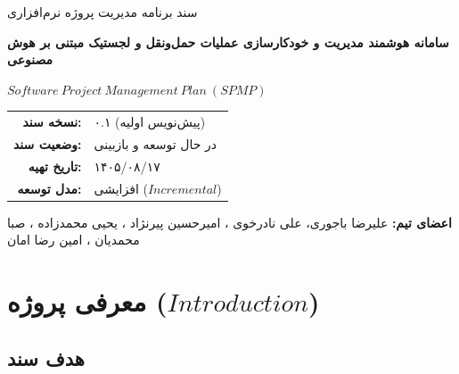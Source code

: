 \documentclass[12pt,a4paper]{article}
\begin{document}
	
	
	\begin{titlepage}
		\centering
		
		\vspace*{2cm}
		
		{\Large سند برنامه مدیریت پروژه نرم‌افزاری}
		
		\vspace{1cm}
		
		{\huge\bfseries
			سامانه هوشمند مدیریت و خودکارسازی
			عملیات حمل‌ونقل و لجستیک
			مبتنی بر هوش مصنوعی
		}
		
		\vspace{1.5cm}
		
		{\Large $Software\ Project\ Management\ Plan\ (SPMP)$}
		
		\vspace{2cm}
		
		\begin{tabular}{rl}
			\textbf{نسخه سند:} & ۰.۱ (پیش‌نویس اولیه) \\
			\textbf{وضعیت سند:} & در حال توسعه و بازبینی \\
			\textbf{تاریخ تهیه:} & ۱۴۰۵/۰۸/۱۷ \\
			\textbf{مدل توسعه:} & افزایشی ($Incremental$) \\
		\end{tabular}
		
		\textbf{اعضای تیم:} علیرضا باجوری، علی نادرخوی ، امیرحسین پیرنژاد ، یحیی محمدزاده ، صبا محمدیان ، امین رضا امان
		\vfill
		
		
	\end{titlepage}
	
	\tableofcontents
	\newpage
	

	
	\newpage
	
	
	\section{معرفی پروژه ($Introduction$)}
	
	\subsection{هدف سند}
	
\end{document}
